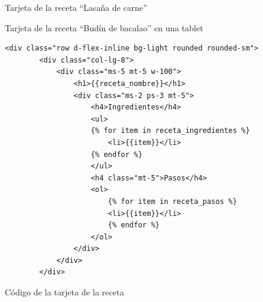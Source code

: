\begin{figure}[h!]
\centering
{}
\caption{Tarjeta de la receta ``Lasaña de carne''}
\label{fig:receta}
\end{figure}

\begin{figure}[h!]
\centering
{}
\caption{Tarjeta de la receta ``Budín de bacalao'' en una tablet}
\label{fig:receta-tablet}
\end{figure}

\begin{figure}
\begin{lstlisting}[style=consola]
    <div class="row d-flex-inline bg-light rounded rounded-sm">
        <div class="col-lg-8">
            <div class="ms-5 mt-5 w-100">
                <h1>{{receta_nombre}}</h1>
                <div class="ms-2 ps-3 mt-5">
                    <h4>Ingredientes</h4>
                    <ul>
                    {% for item in receta_ingredientes %}
                        <li>{{item}}</li>
                    {% endfor %}
                    </ul>
                    <h4 class="mt-5">Pasos</h4>
                    <ol>
                        {% for item in receta_pasos %}
                        <li>{{item}}</li>
                        {% endfor %}
                    </ol>
                </div>
            </div>
        </div>
\end{lstlisting}
\caption{Código de la tarjeta de la receta}
\label{sni:}
\end{figure}

